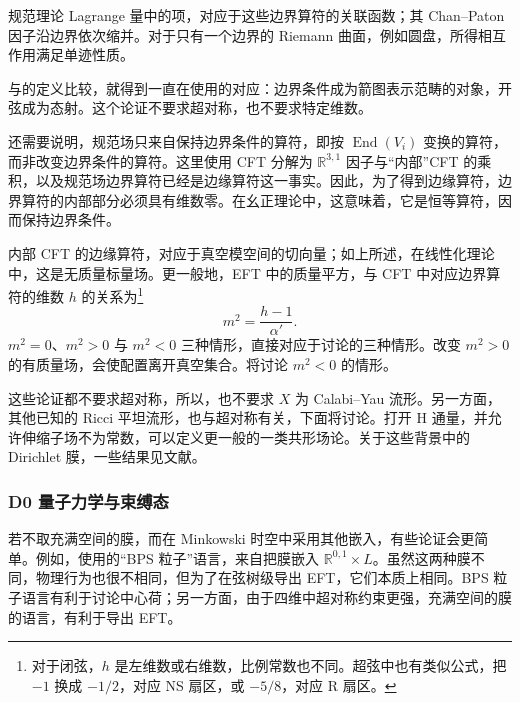规范理论 Lagrange 量中的项，对应于这些边界算符的关联函数；其 Chan--Paton 因子沿边界依次缩并。对于只有一个边界的 Riemann 曲面，例如圆盘，所得相互作用满足单迹性质。

与的定义比较，就得到一直在使用的对应：边界条件成为箭图表示范畴的对象，开弦成为态射。这个论证不要求超对称，也不要求特定维数。

还需要说明，规范场只来自保持边界条件的算符，即按 $\operatorname{End}(V_i)$ 变换的算符，而非改变边界条件的算符。这里使用 CFT 分解为 $\mathbb{R}^{3,1}$ 因子与“内部”CFT 的乘积，以及规范场边界算符已经是边缘算符这一事实。因此，为了得到边缘算符，边界算符的内部部分必须具有维数零。在幺正理论中，这意味着，它是恒等算符，因而保持边界条件。

内部 CFT 的边缘算符，对应于真空模空间的切向量；如上所述，在线性化理论中，这是无质量标量场。更一般地，EFT 中的质量平方，与 CFT 中对应边界算符的维数 $h$ 的关系为\footnote{对于闭弦，$h$ 是左维数或右维数，比例常数也不同。超弦中也有类似公式，把 $-1$ 换成 $-1/2$，对应 NS 扇区，或 $-5/8$，对应 R 扇区。}
\begin{equation}\label{eq:5.85}
m^2=\frac{h-1}{\alpha'}.
\end{equation}
$m^2=0$、$m^2>0$ 与 $m^2<0$ 三种情形，直接对应于讨论的三种情形。改变 $m^2>0$ 的有质量场，会使配置离开真空集合。将讨论 $m^2<0$ 的情形。

这些论证都不要求超对称，所以，也不要求 $X$ 为 Calabi--Yau 流形。另一方面，其他已知的 Ricci 平坦流形，也与超对称有关，下面将讨论。打开 H 通量，并允许伸缩子场不为常数，可以定义更一般的一类共形场论。关于这些背景中的 Dirichlet 膜，一些结果见文献。

\subsubsection{D0 量子力学与束缚态}\label{sec:5.4.2.2}

若不取充满空间的膜，而在 Minkowski 时空中采用其他嵌入，有些论证会更简单。例如，使用的“BPS 粒子”语言，来自把膜嵌入 $\mathbb{R}^{0,1}\times L$。虽然这两种膜不同，物理行为也很不相同，但为了在弦树级导出 EFT，它们本质上相同。BPS 粒子语言有利于讨论中心荷；另一方面，由于四维中超对称约束更强，充满空间的膜的语言，有利于导出 EFT。

